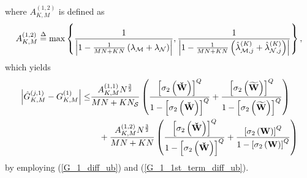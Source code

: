 \documentclass[11pt, draftclsnofoot, onecolumn]{IEEEtran}
\newcommand{\cW}{{\check{W}}}
\newcommand{\tW}{{\widetilde{W}}}
\begin{document}
\begin{IEEEproof}
\begin{equation}
\end{equation}
where $A_{K,M}^{(1,2)}$ is defined as
\begin{equation} \label{A_1_2_define}
A_{K,M}^{(1,2)} \buildrel \Delta \over = \max \left\{ {\frac{1}{{\left| {1 - \frac{1}{{MN + KN}}\left( {{\lambda _{\cal M}} + {\lambda _{\cal N}}} \right)} \right|}},\frac{1}{{\left| {1 - \frac{1}{{MN + KN}}\left( {\hat \lambda _{{\cal M},j}^{(K)} + \hat \lambda _{{\cal N},j}^{(K)}} \right)} \right|}}} \right\},
\end{equation}
which yields
\begin{align} \notag
\left| {\hat G_{K,M}^{(j,1)} - G_{K,M}^{(1)}} \right|  \le & \frac{{A_{K,M}^{(1,1)}{N^{\frac{3}{2}}}}}{{MN + K{N_{\cal S}}}}\left( {\frac{{{{\left[ {{\sigma _2}\left( {\bf{\cW}} \right)} \right]}^Q}}}{{1 - {{\left[ {{\sigma _2}\left( {\bf{\cW}} \right)} \right]}^Q}}} + \frac{{{{\left[ {{\sigma _2}\left( {\bf{\tW}} \right)} \right]}^Q}}}{{1 - {{\left[ {{\sigma _2}\left( {\bf{\tW}} \right)} \right]}^Q}}}} \right) \\ \label{G_1_diff_ub_final}
& \quad  + \frac{{A_{K,M}^{(1,2)}{N^{\frac{3}{2}}}}}{{MN + KN}}\left( {\frac{{{{\left[ {{\sigma _2}\left( {\bf{\cW}} \right)} \right]}^Q}}}{{1 - {{\left[ {{\sigma _2}\left( {\bf{\cW}} \right)} \right]}^Q}}} + \frac{{{{\left[ {{\sigma _2}\left( {\bf{W}} \right)} \right]}^Q}}}{{1 - {{\left[ {{\sigma _2}\left( {\bf{W}} \right)} \right]}^Q}}}} \right)
\end{align}
by employing (\ref{G_1_diff_ub}) and (\ref{G_1_1st_term_diff_ub}).


\end{IEEEproof}
\end{document}
